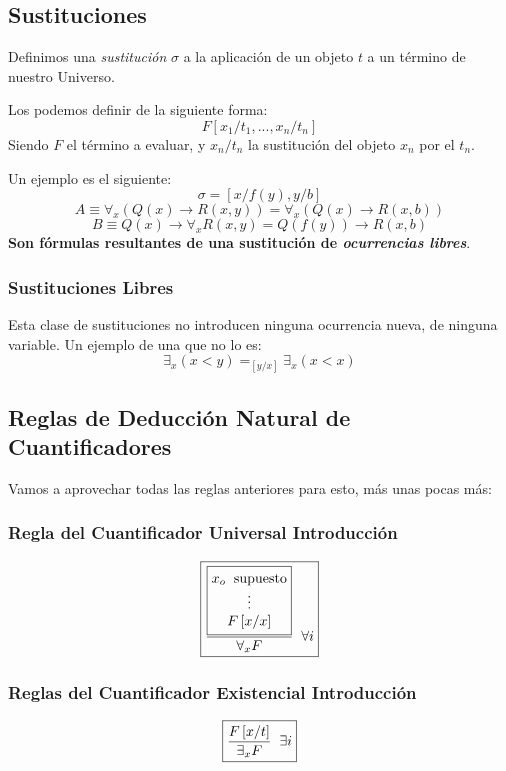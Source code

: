 \subsection{Sustituciones}
\noindent Definimos una \textit{sustitución} \(\sigma \) a la aplicación de un objeto \(t\) a un término de nuestro Universo.
\par \noindent Los podemos definir de la siguiente forma:
\[
        \boxed{F\left [ x_1 / t_1, ..., x_n / t_n \right ]}
\]
\noindent Siendo \(F\) el término a evaluar, y \(x_n / t_n\) la sustitución del objeto \(x_n\) por el \(t_n\).
\par \noindent Un ejemplo es el siguiente:
\[\sigma = \left [ x / f(y),  y/b \right ]\]
\[A \equiv \forall_x (Q(x) \rightarrow R(x,y)) = \forall_x (Q(x) \rightarrow R(x,b))\]
\[B \equiv Q(x) \rightarrow \forall_x R(x,y) = Q(f(y)) \rightarrow R(x,b)\]
\noindent \textbf{Son fórmulas resultantes de una sustitución de \textit{ocurrencias libres}}.
\subsubsection{Sustituciones Libres}
\noindent Esta clase de sustituciones no introducen ninguna  ocurrencia nueva, de ninguna variable. Un ejemplo de una que no lo es:
\[\exists_x (x < y) =_{\left [ y/x \right ]} \exists_x(x<x)\]
\subsection{Reglas de Deducción Natural de Cuantificadores}
\noindent Vamos a aprovechar todas las reglas anteriores para esto, más unas pocas más:
\subsubsection{Regla del Cuantificador Universal Introducción}
\[
        \boxed{\frac{\boxed{\begin{matrix}
                                        x_o \hspace{2mm}\text{supuesto} \\
                                        \vdots                          \\
                                        F\left [ x/x \right ]
                                \end{matrix}}}{\forall_x F} \hspace{2mm} \forall i}
\]
\subsubsection{Reglas del Cuantificador Existencial Introducción}
\[
        \boxed{\frac{F\left [ x/t \right ]}{\exists_xF} \hspace{2mm} \exists i}
\]
